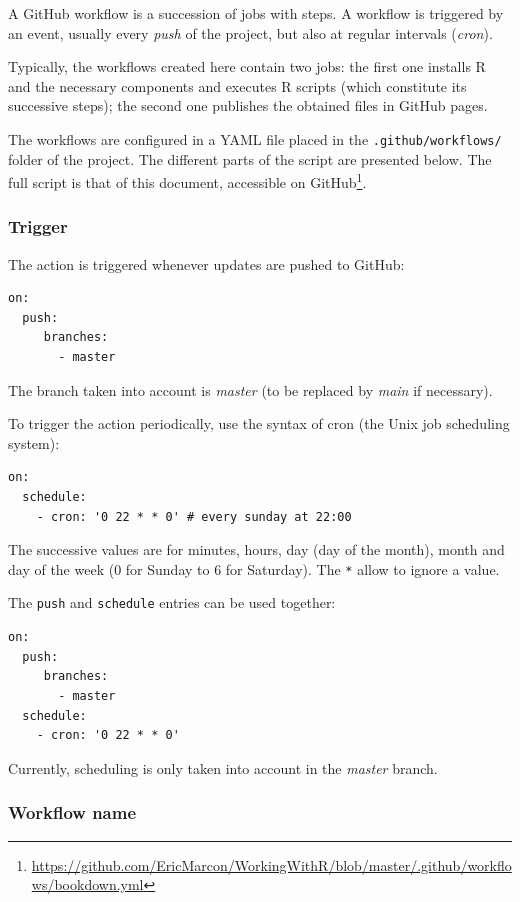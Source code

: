 \documentclass[
  12pt,
  american,
  a4paper,
  extrafontsizes,onecolumn,openright
  ]{memoir}
\begin{document}
A GitHub workflow is a succession of jobs with steps.
A workflow is triggered by an event, usually every \emph{push} of the project, but also at regular intervals (\emph{cron}).

Typically, the workflows created here contain two jobs: the first one installs R and the necessary components and executes R scripts (which constitute its successive steps); the second one publishes the obtained files in GitHub pages.

The workflows are configured in a YAML file placed in the \texttt{.github/workflows/} folder of the project.
The different parts of the script are presented below.
The full script is that of this document, accessible on GitHub\footnote{\url{https://github.com/EricMarcon/WorkingWithR/blob/master/.github/workflows/bookdown.yml}}.

\subsubsection{Trigger}\label{sec:declenchement}

The action is triggered whenever updates are pushed to GitHub:

\begin{verbatim}
on:
  push:
     branches:
       - master
\end{verbatim}

The branch taken into account is \emph{master} (to be replaced by \emph{main} if necessary).

To trigger the action periodically, use the syntax of cron (the Unix job scheduling system):

\begin{verbatim}
on:
  schedule:
    - cron: '0 22 * * 0' # every sunday at 22:00
\end{verbatim}

The successive values are for minutes, hours, day (day of the month), month and day of the week (0 for Sunday to 6 for Saturday).
The \texttt{*} allow to ignore a value.

The \texttt{push} and \texttt{schedule} entries can be used together:

\begin{verbatim}
on:
  push:
     branches:
       - master
  schedule:
    - cron: '0 22 * * 0'
\end{verbatim}

Currently, scheduling is only taken into account in the \emph{master} branch.

\subsubsection{Workflow name}\label{workflow-name}
\end{document}
